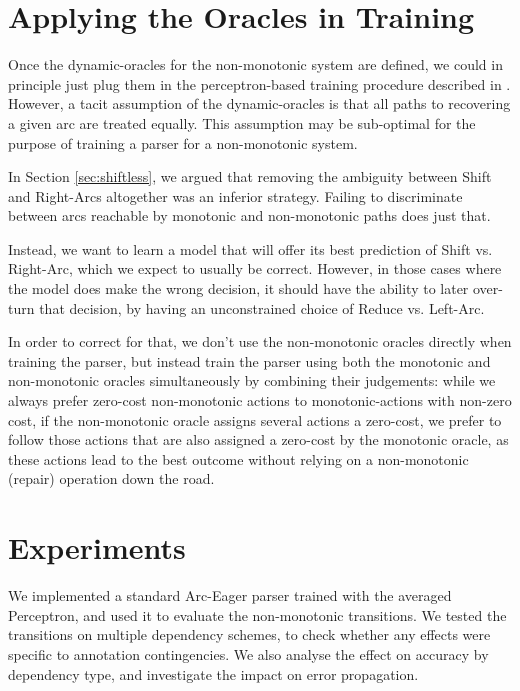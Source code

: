 \documentclass[11pt,letterpaper]{article}
\begin{document}
\section{Applying the Oracles in Training}

Once the dynamic-oracles for the non-monotonic system are defined, we could in
principle just plug them in the perceptron-based training procedure described
in \citet{goldberg:12}.
However, a tacit assumption of the dynamic-oracles is that all paths to
recovering a given arc are treated equally. This assumption may be sub-optimal
for the purpose of training a parser for a non-monotonic system.

In Section \ref{sec:shiftless}, we argued that removing the ambiguity between
Shift and Right-Arcs altogether was an inferior strategy. Failing to discriminate
between arcs reachable by monotonic and non-monotonic paths does just that.

Instead,  we want to learn a model that will offer its best prediction of Shift vs.
Right-Arc, which we expect to usually be correct.  However, in those cases
where the model does make the wrong decision, it should have the ability to later over-turn that decision, by having an unconstrained
choice of Reduce vs. Left-Arc.

In order to correct for that, we don't use the non-monotonic oracles directly
when training the parser, but instead train the parser using both the
monotonic and non-monotonic oracles simultaneously by combining their
judgements: while we always prefer zero-cost non-monotonic actions to
monotonic-actions with non-zero cost, if the non-monotonic oracle assigns
several actions a zero-cost,
we prefer to follow those actions that are also assigned a zero-cost by the
monotonic oracle, as these actions lead to the best outcome without
relying on a non-monotonic (repair) operation down the road.


\section{Experiments}

We implemented a standard Arc-Eager parser trained with the averaged Perceptron,
and used it to evaluate the non-monotonic transitions. We tested the transitions on
multiple dependency schemes, to check whether any effects were specific to annotation
contingencies. We also analyse the effect on accuracy by dependency type, and
investigate the impact on error propagation.
\end{document}
